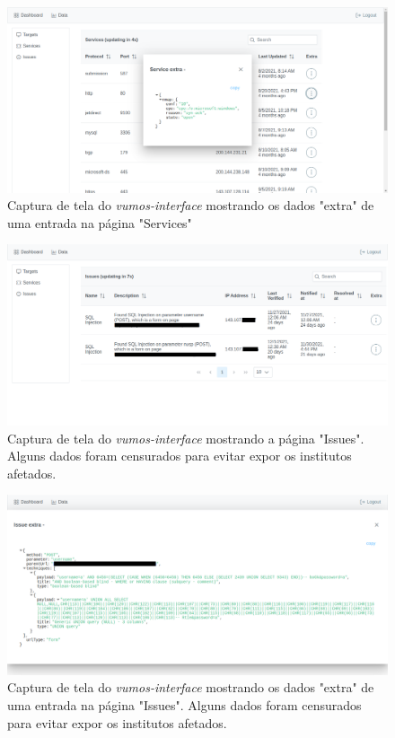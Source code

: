 \begin{figure}[H]
    \includegraphics[scale=0.32]{figuras/vumos-interface-service-extra.png}
    \caption{Captura de tela do \textit{vumos-interface} mostrando os dados "extra" de uma entrada na página "Services"}
\end{figure}

\begin{figure}[H]
    \includegraphics[scale=0.32]{figuras/vumos-interface-issues.png}
    \caption{Captura de tela do \textit{vumos-interface} mostrando a página "Issues". Alguns dados foram censurados para evitar expor os institutos afetados.}
\end{figure}


\begin{figure}[H]
    \includegraphics[scale=0.32]{figuras/vumos-interface-issue-extra.png}
    \caption{Captura de tela do \textit{vumos-interface} mostrando os dados "extra" de uma entrada na página "Issues". Alguns dados foram censurados para evitar expor os institutos afetados.}
\end{figure}